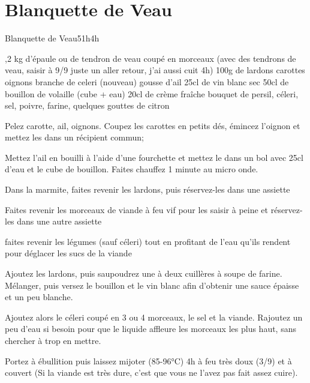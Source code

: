 {\section{Blanquette de Veau}
\begin{recette}{Blanquette de Veau}{5}{1h}{4h}
\begin{ingredients}
,2 kg d'épaule ou de tendron de veau coupé en morceaux (avec des tendrons de veau, saisir à 9/9 juste un aller retour, j'ai aussi cuit 4h)
\ingredient 100g de lardons
 carottes
 oignons
 branche de celeri (nouveau)
 gousse d'ail
\ingredient 25cl de vin blanc sec
\ingredient 50cl de bouillon de volaille (cube + eau)
\ingredient 20cl de crème fraîche
 bouquet de persil, céleri, sel, poivre, farine, quelques gouttes de citron
\end{ingredients}

\begin{preparation}
\etape Pelez carotte, ail, oignons. Coupez les carottes en petits dés, émincez l'oignon et mettez les dans un récipient commun;

\etape Mettez l'ail en bouilli à l'aide d'une fourchette et mettez le dans un bol avec 25cl d'eau et le cube de bouillon. 
Faites chauffez 1 minute au micro onde.

\etape Dans la marmite, faites revenir les lardons, puis réservez-les dans une assiette

\etape Faites revenir les morceaux de viande à feu vif pour les saisir à peine et réservez-les dans une autre assiette

\etape faites revenir les légumes (sauf céleri) tout en profitant de l'eau qu'ils rendent pour déglacer les sucs de la viande

\etape Ajoutez les lardons, puis saupoudrez une à deux cuillères à soupe de farine. Mélanger, puis versez le bouillon et le vin 
blanc afin d'obtenir une sauce épaisse et un peu blanche. 

\etape Ajoutez alors le céleri coupé en 3 ou 4 morceaux, le sel et la viande. Rajoutez un peu d'eau si besoin pour que le liquide affleure les morceaux les plus haut, sans chercher à trop en mettre.

\etape Portez à ébullition puis laissez mijoter (85-96°C) 4h à feu très doux (3/9) et à couvert (Si la viande est 
très dure, c'est 
que vous ne l'avez pas fait assez cuire). 


\end{preparation}
\end{recette}}
